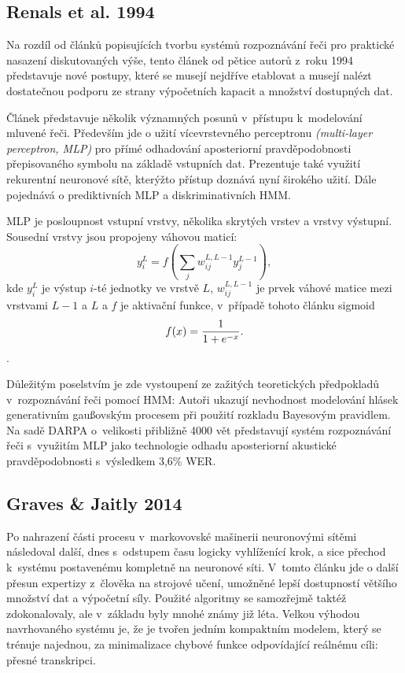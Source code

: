 \subsection{Renals et al. 1994}

Na rozdíl od článků popisujících tvorbu systémů rozpoznávání řeči pro praktické
nasazení diskutovaných výše, tento článek od pětice autorů z~roku
1994\cite{renals1994connectionist} představuje nové postupy, které se musejí
nejdříve etablovat a musejí nalézt dostatečnou podporu ze strany výpočetních
kapacit a množství dostupných dat.

Článek představuje několik významných posunů v~přístupu k~modelování mluvené
řeči. Především jde o užití vícevrstevného perceptronu \textit{(multi-layer
perceptron, MLP)} pro přímé odhadování aposteriorní pravděpodobnosti
přepisovaného symbolu na základě vstupních dat. Prezentuje také využití
rekurentní neuronové sítě, kterýžto přístup doznává nyní širokého užití. Dále
pojednává o prediktivních MLP a diskriminativních HMM.

MLP je posloupnost vstupní vrstvy, několika skrytých vrstev a vrstvy výstupní.
Sousední vrstvy jsou propojeny váhovou maticí:
\begin{equation}
y_i^L = f(\sum_j w_{ij}^{L,L-1}y_j^{L-1}),
\end{equation}
kde $y_i^L$ je výstup $i$-té jednotky ve vrstvě $L$,
$w_{ij}^{L,L-1}$ je prvek váhové matice mezi vrstvami $L - 1$ a $L$
a $f$ je aktivační funkce, v~případě tohoto článku sigmoid
\begin{equation}
f(x) = {{1}\over{1 + e^{-x}}}.
\end{equation}.

Důležitým poselstvím je zde vystoupení ze zažitých teoretických předpokladů
v~rozpoznávání řeči pomocí HMM: Autoři ukazují nevhodnost modelování hlásek
generativním gaußovským procesem při použití rozkladu Bayesovým pravidlem.
Na sadě DARPA o~velikosti přibližně 4000 vět představují systém rozpoznávání
řeči s~využitím MLP jako technologie odhadu aposteriorní akustické
pravděpodobnosti s~výsledkem 3,6\% WER.

\subsection{Graves \& Jaitly 2014}

Po nahrazení části procesu v~markovovské mašinerii neuronovými sítěmi následoval
další, dnes s~odstupem času logicky vyhlíženící krok, a sice přechod k~systému
postavenému kompletně na neuronové síti. V~tomto článku\cite{graves2014towards}
jde o další přesun expertizy z~člověka na strojové učení, umožněné lepší
dostupností většího množství dat a výpočetní síly. Použité algoritmy se
samozřejmě taktéž zdokonalovaly, ale v~základu byly mnohé známy již léta. Velkou
výhodou navrhovaného systému je, že je tvořen jedním kompaktním modelem, který
se trénuje najednou, za minimalizace chybové funkce odpovídající reálnému cíli:
přesné transkripci.

